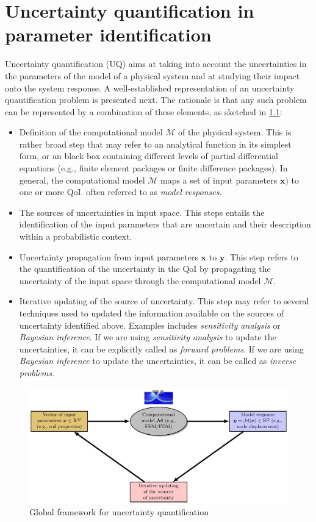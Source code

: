 \chapter{Uncertainty quantification in parameter identification}
\label{UQ}
Uncertainty quantification (UQ) aims at taking into account the uncertainties in the parameters of the model of a physical system and at studying their impact onto the system response. A well-established representation of an uncertainty quantification problem is presented next. The rationale is that any such problem can be represented by a combination of these elements, as sketched in \cref{fig: UQ_steps}:
\begin{itemize}
    \item Definition of the computational model $\mathcal{M}$ of the physical system. This is rather broad step that may refer to an analytical function in its simplest form, or an black box containing different levels of partial differential equations (e.g., finite element packages or finite difference packages). In general, the computational model $\mathcal{M}$ maps a set of input parameters $\boldsymbol{x})$ to one or more \acrfull{QoI}. often referred to as \textit{model responses}.
    \item The sources of uncertainties in input space. This steps entails the identification of the input parameters that are uncertain and their description within a probabilistic context.
    \item Uncertainty propagation from input parameters $\boldsymbol{x}$ to $\boldsymbol{y}$. This step refers to the quantification of the uncertainty in the \acrshort{QoI} by propagating the uncertainty of the input space through the computational model $\mathcal{M}$. 
    \item Iterative updating of the source of uncertainty. This step may refer to several techniques used to updated the information available on the sources of uncertainty identified above. Examples includes \textit{sensitivity analysis} or \textit{Bayesian inference}. If we are using \textit{sensitivity analysis} to update the uncertainties, it can be explicitly called as \textit{forward problems}. If we are using \textit{Bayesian inference} to update the uncertainties, it can be called as \textit{inverse problems}.
\end{itemize}
\begin{figure}[htbp]
    \centering
    \includegraphics[width = 140mm]{Figures/figure-UQ_steps.pdf}
    \caption{Global framework for uncertainty quantification}
    \label{fig: UQ_steps}
\end{figure}

